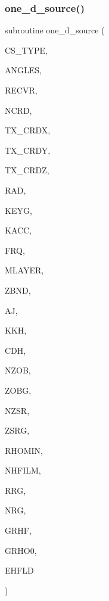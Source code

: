 \subsubsection{\texorpdfstring{one\+\_\+d\+\_\+source()}{one\_d\_source()}}
{\footnotesize\ttfamily subroutine one\+\_\+d\+\_\+source (\begin{DoxyParamCaption}\item[{integer, intent(in)}]{C\+S\+\_\+\+T\+Y\+PE,  }\item[{real, dimension(2), intent(in)}]{A\+N\+G\+L\+ES,  }\item[{real, dimension(3), intent(in)}]{R\+E\+C\+VR,  }\item[{integer, intent(in)}]{N\+C\+RD,  }\item[{real, dimension(ncrd), intent(in)}]{T\+X\+\_\+\+C\+R\+DX,  }\item[{real, dimension(ncrd), intent(in)}]{T\+X\+\_\+\+C\+R\+DY,  }\item[{real, dimension(ncrd), intent(in)}]{T\+X\+\_\+\+C\+R\+DZ,  }\item[{real, intent(in)}]{R\+AD,  }\item[{integer, intent(in)}]{K\+E\+YG,  }\item[{integer, intent(in)}]{K\+A\+CC,  }\item[{real, intent(in)}]{F\+RQ,  }\item[{integer, intent(in)}]{M\+L\+A\+Y\+ER,  }\item[{real, dimension(0\+:mlayer), intent(in)}]{Z\+B\+ND,  }\item[{real, intent(in)}]{AJ,  }\item[{complex, dimension(0\+:mlayer), intent(in)}]{K\+KH,  }\item[{complex, dimension(0\+:mlayer), intent(in)}]{C\+DH,  }\item[{integer, intent(in)}]{N\+Z\+OB,  }\item[{real, dimension(nzob), intent(in)}]{Z\+O\+BG,  }\item[{integer, intent(in)}]{N\+Z\+SR,  }\item[{real, dimension(2,nzsr), intent(in)}]{Z\+S\+RG,  }\item[{real, intent(in)}]{R\+H\+O\+M\+IN,  }\item[{integer, intent(in)}]{N\+H\+F\+I\+LM,  }\item[{real, dimension(nrg), intent(in)}]{R\+RG,  }\item[{integer, intent(in)}]{N\+RG,  }\item[{complex, dimension(11,nhfilm,nzsr,nzob), intent(in)}]{G\+R\+HF,  }\item[{complex, dimension(4,nzsr,nzob), intent(in)}]{G\+R\+H\+O0,  }\item[{complex, dimension(6), intent(out)}]{E\+H\+F\+LD }\end{DoxyParamCaption})}

